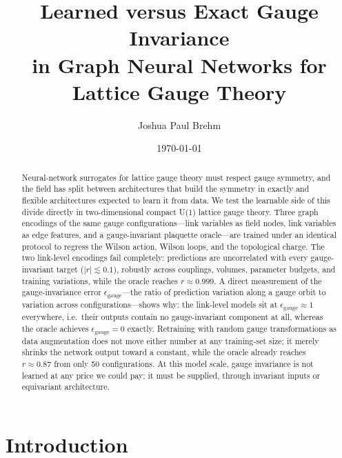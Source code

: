\documentclass[aps,prd,twocolumn,superscriptaddress,nofootinbib]{revtex4-2}
\newcommand{\epsg}{\ensuremath{\epsilon_{\text{gauge}}}}
\begin{document}
\title{Learned versus Exact Gauge Invariance\\in Graph Neural Networks for Lattice Gauge Theory}

\author{Joshua Paul Brehm}

\date{\today}

\begin{abstract}
Neural-network surrogates for lattice gauge theory must respect gauge
symmetry, and the field has split between architectures that build the
symmetry in exactly and flexible architectures expected to learn it from
data. We test the learnable side of this divide directly in
two-dimensional compact U(1) lattice gauge theory. Three graph encodings
of the same gauge configurations---link variables as field nodes, link
variables as edge features, and a gauge-invariant plaquette oracle---are
trained under an identical protocol to regress the Wilson action, Wilson
loops, and the topological charge. The two link-level encodings fail
completely: predictions are uncorrelated with every gauge-invariant
target ($|r| \lesssim 0.1$), robustly across couplings, volumes,
parameter budgets, and training variations, while the oracle reaches
$r \approx 0.999$. A direct measurement of the gauge-invariance error
\epsg{}---the ratio of prediction variation along a gauge orbit to
variation across configurations---shows why: the link-level models sit
at $\epsg \approx 1$ everywhere, i.e.\ their outputs contain no
gauge-invariant component at all, whereas the oracle achieves
$\epsg = 0$ exactly. Retraining with random gauge transformations as
data augmentation does not move either number at any training-set size;
it merely shrinks the network output toward a constant, while the oracle
already reaches $r \approx 0.87$ from only 50 configurations. At this
model scale, gauge invariance is not learned at any price we could pay;
it must be supplied, through invariant inputs or equivariant
architecture.
\end{abstract}

\maketitle

\section{Introduction}
\label{sec:intro}
\end{document}
